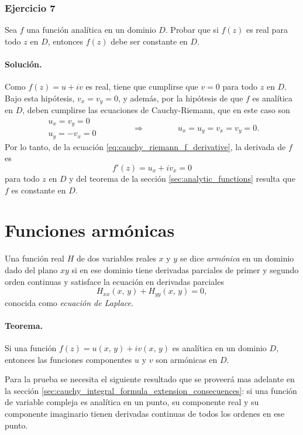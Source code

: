 \documentclass[a4paper]{report}
\begin{document}
\subsubsection{Ejercicio 7}

Sea \(f\) una función analítica en un dominio \(D\). Probar que si \(f(z)\) es real para todo \(z\) en \(D\), entonces \(f(z)\) debe ser constante en \(D\).

\paragraph{Solución.} Como \(f(z)=u+iv\) es real, tiene que cumplirse que \(v=0\) para todo \(z\) en \(D\). Bajo esta hipótesis, \(v_x=v_y=0\), y además, por la hipótesis de que \(f\) es analítica en \(D\), deben cumplirse las ecuaciones de Cauchy-Riemann, que en este caso son
\[
 \begin{array}{l}
  u_x=v_y=0\\
  u_y=-v_x=0
 \end{array}
 \qquad\qquad\Rightarrow\qquad\qquad
 u_x=u_y=v_x=v_y=0.
\]
Por lo tanto, de la ecuación \ref{eq:cauchy_riemann_f_derivative}, la derivada de \(f\) es
\[
 f'(z)=u_x+iv_x=0
\]
para todo \(z\) en \(D\) y del teorema de la sección \ref{sec:analytic_functions} resulta que \(f\) es constante en \(D\).

\section{Funciones armónicas}\label{sec:harmonic_functions}

Una función real \(H\) de dos variables reales \(x\) y \(y\) se dice \emph{armónica} en un dominio dado del plano \(xy\) si en ese dominio tiene derivadas parciales de primer y segundo orden continuas y satisface la ecuación en derivadas parciales
\begin{equation}\label{eq:laplace_equation}
 H_{xx}(x,\,y)+H_{yy}(x,\,y)=0, 
\end{equation}
conocida como \emph{ecuación de Laplace}.

\paragraph{Teorema.} Si una función \(f(z)=u(x,\,y)+iv(x,\,y)\) es analítica en un dominio \(D\), entonces las funciones componentes \(u\) y \(v\) son armónicas en \(D\). 

Para la prueba se necesita el siguiente resultado que se proveerá mas adelante en la sección \ref{sec:cauchy_integral_formula_extension_consecuences}: si una función de variable compleja es analítica en un punto, su componente real y su componente imaginario tienen derivadas continuas de todos los ordenes en ese punto. 
\end{document}
